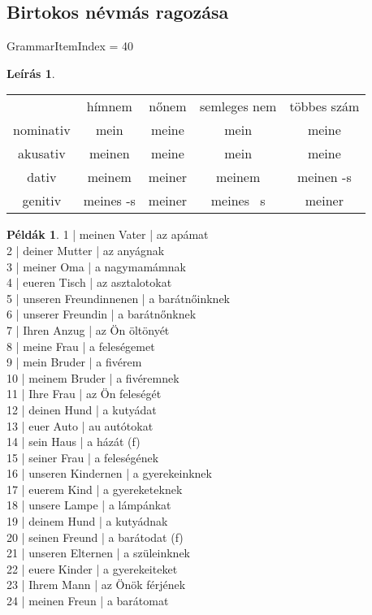 \documentclass{article}
\theoremstyle{definition}
\newtheorem*{exmp}{Példák}
\newtheorem*{desc}{Leírás}
\begin{document}
\subsection{Birtokos névmás ragozása}

GrammarItemIndex = 40

\begin{desc}
\begin{tabular}{ccccc}
 & hímnem & nőnem & semleges nem & többes szám \\
nominativ & mein & meine & mein & meine \\
akusativ & meinen & meine & mein & meine \\
dativ & meinem & meiner & meinem & meinen -s \\
genitiv & meines -s & meiner & meines ~s & meiner \\
\end{tabular}
\end{desc}

\begin{exmp}	%
1 | meinen Vater | az apámat\\
2 | deiner Mutter | az anyágnak\\
3 | meiner Oma | a nagymamámnak\\
4 | eueren Tisch | az asztalotokat\\
5 | unseren Freundinnenen | a barátnőinknek\\
6 | unserer Freundin | a barátnőnknek\\
7 | Ihren Anzug | az Ön öltönyét\\
8 | meine Frau | a feleségemet\\
9 | mein Bruder | a fivérem\\
10 | meinem Bruder | a fivéremnek\\
11 | Ihre Frau | az Ön feleségét\\
12 | deinen Hund | a kutyádat\\
13 | euer Auto | au autótokat\\
14 | sein Haus | a házát (f)\\
15 | seiner Frau | a feleségének\\
16 | unseren Kindernen | a gyerekeinknek\\
17 | euerem Kind | a gyereketeknek\\
18 | unsere Lampe | a lámpánkat\\
19 | deinem Hund | a kutyádnak\\
20 | seinen Freund | a barátodat (f)\\
21 | unseren Elternen | a szüleinknek\\
22 | euere Kinder | a gyerekeiteket\\
23 | Ihrem Mann | az Önök férjének\\
24 | meinen Freun | a barátomat\\
\end{exmp}
\end{document}
